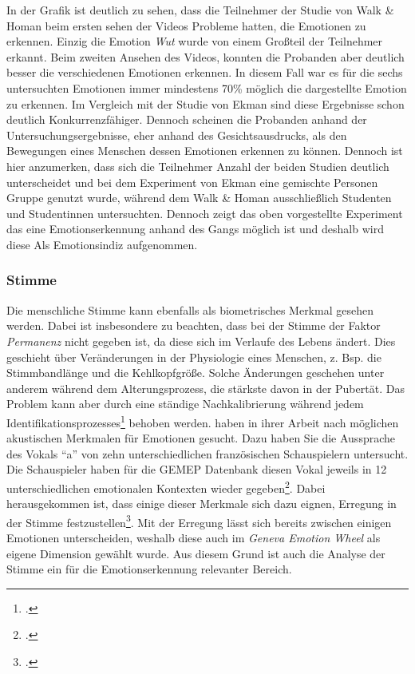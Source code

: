 In der Grafik ist deutlich zu sehen, dass die Teilnehmer der Studie von Walk \& Homan beim ersten sehen der Videos Probleme hatten, die Emotionen zu erkennen. Einzig die Emotion \textit{Wut} wurde von einem Großteil der Teilnehmer erkannt. Beim zweiten Ansehen des Videos, konnten die Probanden aber deutlich besser die verschiedenen Emotionen erkennen. In diesem Fall war es für die sechs untersuchten Emotionen immer mindestens 70\% möglich die dargestellte Emotion zu erkennen. Im Vergleich mit der Studie von Ekman sind diese Ergebnisse schon deutlich Konkurrenzfähiger. Dennoch scheinen die Probanden anhand der Untersuchungsergebnisse, eher anhand des Gesichtsausdrucks, als den Bewegungen eines Menschen dessen Emotionen erkennen zu können. Dennoch ist hier anzumerken, dass sich die Teilnehmer Anzahl der beiden Studien deutlich unterscheidet und bei dem Experiment von Ekman eine gemischte Personen Gruppe genutzt wurde, während dem Walk \& Homan ausschließlich Studenten und Studentinnen untersuchten.\newline
Dennoch zeigt das oben vorgestellte Experiment das eine Emotionserkennung anhand des Gangs möglich ist und deshalb wird diese Als Emotionsindiz aufgenommen.
\subsubsection{Stimme}
Die menschliche Stimme kann ebenfalls als biometrisches Merkmal gesehen werden. Dabei ist insbesondere zu beachten, dass bei der Stimme der Faktor \textit{Permanenz} nicht gegeben ist, da diese sich im Verlaufe des Lebens ändert. Dies geschieht über Veränderungen in der Physiologie eines Menschen, z. Bsp. die Stimmbandlänge und die Kehlkopfgröße. Solche Änderungen geschehen unter anderem während dem Alterungsprozess, die stärkste davon in der Pubertät. Das Problem kann aber durch eine ständige Nachkalibrierung während jedem Identifikationsprozesses\footcite[Vgl. ][S.198 Z.22-26]{Til11} behoben werden.\newline
\cite{Pat18} haben in ihrer Arbeit nach möglichen akustischen Merkmalen für Emotionen gesucht. Dazu haben Sie die Aussprache des Vokals ``a'' von zehn unterschiedlichen französischen Schauspielern untersucht. Die Schauspieler haben für die GEMEP Datenbank diesen Vokal jeweils in 12 unterschiedlichen emotionalen Kontexten wieder gegeben\footcite[Vgl. ][S.2 Z.13-16]{Pat18}. Dabei herausgekommen ist, dass einige dieser Merkmale sich dazu eignen, Erregung in der Stimme festzustellen\footcite[Vgl. ][S.4 Z.28-32]{Pat18}. Mit der Erregung lässt sich bereits zwischen einigen Emotionen unterscheiden, weshalb diese auch im \textit{Geneva Emotion Wheel} als eigene Dimension gewählt wurde. Aus diesem Grund ist auch die Analyse der Stimme ein für die Emotionserkennung relevanter Bereich.
